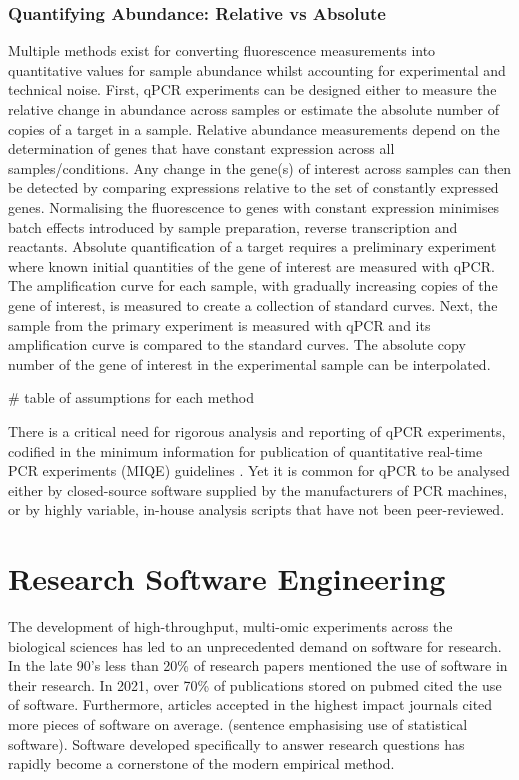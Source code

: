 \documentclass{SBCbookchapter}
\begin{document}
\subsubsection{Quantifying Abundance: Relative vs Absolute}

Multiple methods exist for converting fluorescence measurements into quantitative values for sample abundance whilst accounting for experimental and technical noise. First, qPCR experiments can be designed either to measure the relative change in abundance across samples or estimate the absolute number of copies of a target in a sample. Relative abundance measurements depend on the determination of genes that have constant expression across all samples/conditions. Any change in the gene(s) of interest across samples can then be detected by comparing expressions relative to the set of constantly expressed genes. Normalising the fluorescence to genes with constant expression minimises batch effects introduced by sample preparation, reverse transcription and reactants. Absolute quantification of a target requires a preliminary experiment where known initial quantities of the gene of interest are measured with qPCR. The amplification curve for each sample, with gradually increasing copies of the gene of interest, is measured to create a collection of standard curves. Next, the sample from the primary experiment is measured with qPCR and its amplification curve is compared to the standard curves. The absolute copy number of the gene of interest in the experimental sample can be interpolated.

# table of assumptions for each method

There is a critical need for rigorous analysis and reporting of qPCR experiments, codified in the minimum information for publication of quantitative real-time PCR experiments (MIQE) guidelines \cite{Bustin2009, Bustin2017, Courts2019}. Yet it is common for qPCR to be analysed either by closed-source software supplied by the manufacturers of PCR machines, or by highly variable, in-house analysis scripts that have not been peer-reviewed.


\section{Research Software Engineering}

The development of high-throughput, multi-omic experiments across the biological sciences has led to an unprecedented demand on software for research. In the late 90's less than 20\% of research papers mentioned the use of software in their research. In 2021, over 70\% of publications stored on pubmed cited the use of software. Furthermore, articles accepted in the highest impact journals cited more pieces of software on average. (sentence emphasising use of statistical software). Software developed specifically to answer research questions has rapidly become a cornerstone of the modern empirical method. \cite{Schindler2022}
\end{document}
